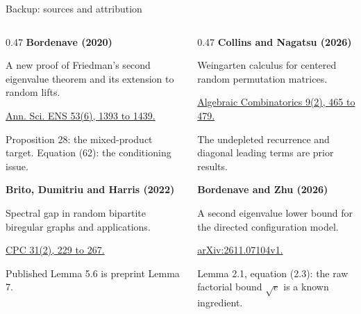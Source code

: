 \documentclass[aspectratio=169,11pt]{beamer}
\newcommand{\slidesource}{}
\newcommand{\source}[1]{\gdef\slidesource{#1}}
\newcommand{\1}{\mathbf 1}
\newcommand{\smallgap}{\vspace{2mm}}
\begin{document}
\source{Bibliographic details are reproduced from the report's verified reference list.}
\begin{frame}{Backup: sources and attribution}
\renewcommand{\smallgap}{\vspace{0.5mm}}
\begin{columns}[T,onlytextwidth]
\begin{column}{0.47\textwidth}
\textbf{Bordenave (2020)}\par\smallgap
\small
A new proof of Friedman's second eigenvalue theorem and its extension to random lifts.\par
\href{https://doi.org/10.24033/asens.2450}{Ann. Sci. ENS 53(6), 1393 to 1439.}\par\smallgap
Proposition 28: the mixed-product target. Equation (62): the conditioning issue.
\vspace{2mm}\par
\normalsize\textbf{Brito, Dumitriu and Harris (2022)}\par\smallgap
\small
Spectral gap in random bipartite biregular graphs and applications.\par
\href{https://doi.org/10.1017/S0963548321000249}{CPC 31(2), 229 to 267.}\par\smallgap
Published Lemma 5.6 is preprint Lemma 7.
\end{column}
\begin{column}{0.47\textwidth}
\textbf{Collins and Nagatsu (2026)}\par\smallgap
\small
Weingarten calculus for centered random permutation matrices.\par
\href{https://doi.org/10.5802/alco.480}{Algebraic Combinatorics 9(2), 465 to 479.}\par\smallgap
The undepleted recurrence and diagonal leading terms are prior results.
\vspace{2mm}\par
\normalsize\textbf{Bordenave and Zhu (2026)}\par\smallgap
\small
A second eigenvalue lower bound for the directed configuration model.\par
\href{https://arxiv.org/abs/2611.07104v1}{arXiv:2611.07104v1.}\par\smallgap
Lemma 2.1, equation (2.3): the raw factorial bound $\sqrt e$ is a known ingredient.
\end{column}
\end{columns}
\end{frame}
\end{document}
